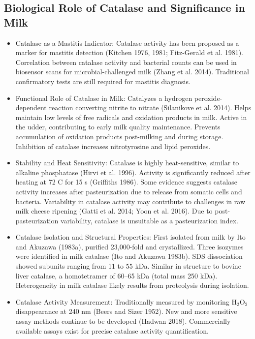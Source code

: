 \subsection*{Biological Role of Catalase and Significance in Milk}

\begin{itemize}
    \item Catalase as a Mastitis Indicator:
    \subitem Catalase activity has been proposed as a marker for mastitis detection (Kitchen 1976, 1981; Fitz-Gerald et al. 1981).
    \subitem Correlation between catalase activity and bacterial counts can be used in biosensor scans for microbial-challenged milk (Zhang et al. 2014).
    \subitem Traditional confirmatory tests are still required for mastitis diagnosis.

    \item Functional Role of Catalase in Milk:
    \subitem Catalyzes a hydrogen peroxide-dependent reaction converting nitrite to nitrate (Silanikove et al. 2014).
    \subitem Helps maintain low levels of free radicals and oxidation products in milk.
    \subitem Active in the udder, contributing to early milk quality maintenance.
    \subitem Prevents accumulation of oxidation products post-milking and during storage.
    \subitem Inhibition of catalase increases nitrotyrosine and lipid peroxides.

    \item Stability and Heat Sensitivity:
    \subitem Catalase is highly heat-sensitive, similar to alkaline phosphatase (Hirvi et al. 1996).
    \subitem Activity is significantly reduced after heating at 72 \textdegree C for 15 s (Griffiths 1986).
    \subitem Some evidence suggests catalase activity increases after pasteurization due to release from somatic cells and bacteria.
    \subitem Variability in catalase activity may contribute to challenges in raw milk cheese ripening (Gatti et al. 2014; Yoon et al. 2016).
    \subitem Due to post-pasteurization variability, catalase is unsuitable as a pasteurization index.

    \item Catalase Isolation and Structural Properties:
    \subitem First isolated from milk by Ito and Akuzawa (1983a), purified 23,000-fold and crystallized.
    \subitem Three isozymes were identified in milk catalase (Ito and Akuzawa 1983b).
    \subitem SDS dissociation showed subunits ranging from 11 to 55 kDa.
    \subitem Similar in structure to bovine liver catalase, a homotetramer of 60–65 kDa (total mass 250 kDa).
    \subitem Heterogeneity in milk catalase likely results from proteolysis during isolation.

    \item Catalase Activity Measurement:
    \subitem Traditionally measured by monitoring H$_2$O$_2$ disappearance at 240 nm (Beers and Sizer 1952).
    \subitem New and more sensitive assay methods continue to be developed (Hadwan 2018).
    \subitem Commercially available assays exist for precise catalase activity quantification.
\end{itemize}

